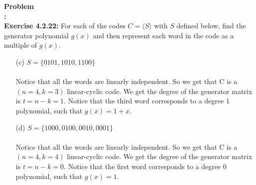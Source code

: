 \documentclass[11pt]{article}
\newenvironment{problem}[1]{\textbf{Problem #1: }}{\newpage}
\begin{document}
	\begin{problem}{5}
		\\ \\
		\textbf{Exercise 4.2.22: } For each of the codes $C = \langle S \rangle$ with $S$  defined below, find the generator polynomial $g(x)$ and then represent each word in the code as a multiple of $g(x)$.
		\begin{enumerate}[label = (\alph*)]
			\item[(c)] $S = \{0101,1010,1100\}$ 
			\\ \\
			Notice that all the words are linearly independent.  So we get that C is a $(n=4,k=3)$ linear-cyclic code.  We get the degree of the generator matrix is $t = n-k = 1$.  Notice that the third word corresponds to a degree 1 polynomial, such that $g(x) = 1 + x$.
			\item[(d)] $S = \{1000,0100,0010,0001\}$
			\\ \\
			Notice that all the words are linearly independent.  So we get that C is a $(n=4,k=4)$ linear-cyclic code.  We get the degree of the generator matrix is $t = n-k = 0$.  Notice that the first word corresponds to a degree 0 polynomial, such that $g(x) = 1$.
		\end{enumerate}
	\end{problem}
	
\end{document}
